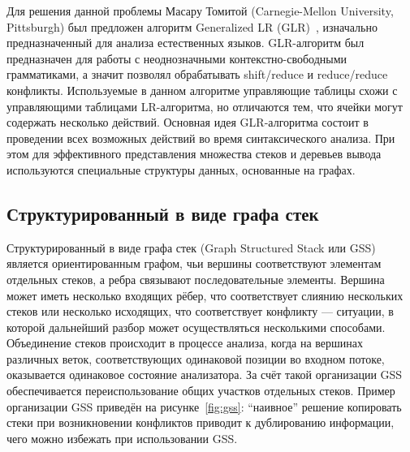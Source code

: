 Для решения данной проблемы Масару Томитой (Carnegie-Mellon University, Pittsburgh) был предложен алгоритм Generalized LR (GLR)~\cite{Tomita}, изначально предназначенный для анализа естественных языков. GLR-алгоритм был предназначен для работы с неоднозначными контекстно-свободными грамматиками, а значит позволял обрабатывать shift/reduce и reduce/reduce конфликты. Используемые в данном алгоритме управляющие таблицы схожи с управляющими таблицами LR-алгоритма, но отличаются тем, что ячейки могут содержать несколько действий. Основная идея GLR-алгоритма состоит в проведении всех возможных действий во время синтаксического анализа. При этом для эффективного представления множества стеков и деревьев вывода используются специальные структуры данных, основанные на графах.

\subsection{Структурированный в виде графа стек}

Структурированный в виде графа стек (Graph Structured Stack или GSS)~\cite{Tomita} является ориентированным графом, чьи вершины соответствуют  элементам отдельных стеков, а ребра связывают последовательные элементы. Вершина может иметь несколько входящих рёбер, что соответствует слиянию нескольких стеков или несколько исходящих, что соответствует конфликту --- ситуации, в которой дальнейший разбор может осуществляться несколькими способами. Объединение стеков происходит в процессе анализа, когда на вершинах различных веток, соответствующих одинаковой позиции во входном потоке, оказывается одинаковое состояние анализатора. За счёт такой организации GSS обеспечивается переиспользование общих участков отдельных стеков. Пример организации GSS приведён на рисунке~\ref{fig:gss}: ``наивное'' решение копировать стеки при возникновении конфликтов приводит к дублированию информации, чего можно избежать при использовании GSS. 

